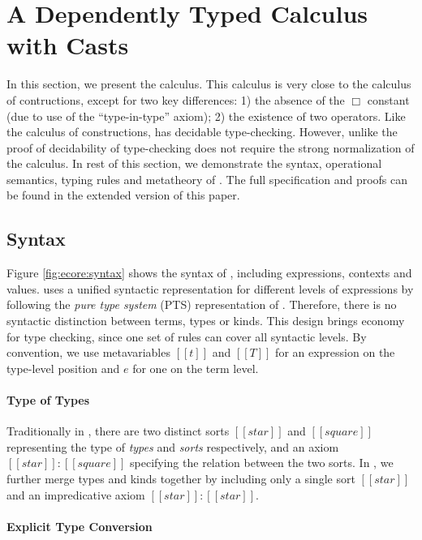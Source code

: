 
\section{A Dependently Typed Calculus with Casts}\label{sec:ecore}

In this section, we present the \ecore calculus. This calculus is very
close to the calculus of contructions, except for two key differences:
1) the absence of the $\Box$ constant (due to use of the
``type-in-type'' axiom); 2) the existence of two \cast operators. Like
the calculus of constructions, \ecore has decidable
type-checking. However, unlike \cc the proof of decidability of
type-checking does not require the strong normalization of the
calculus.  In rest of this section, we demonstrate the syntax,
operational semantics, typing rules and metatheory of \ecore. The
full specification and proofs can be found in the extended version of
this paper.  

\subsection{Syntax}\label{sec:ecore:syn}

Figure \ref{fig:ecore:syntax} shows the syntax of \ecore, including
expressions, contexts and values. \ecore uses a unified syntactic
representation for different levels of expressions by following the
\emph{pure type system} (PTS) representation of \cc. Therefore, there
is no syntactic distinction between terms, types or kinds. This design
brings economy for type checking, since one set of rules can cover
all syntactic levels. By convention, we use metavariables $[[t]]$ and
$[[T]]$ for an expression on the type-level position and $e$ for one
on the term level.

\paragraph{Type of Types}
Traditionally in \cc, there are two distinct sorts $[[star]]$ and
$[[square]]$ representing the type of \emph{types} and \emph{sorts}
respectively, and an axiom $[[star]]:[[square]]$ specifying the
relation between the two sorts. In \ecore, we further merge types and
kinds together by including only a single sort $[[star]]$ and an
impredicative axiom $[[star]]:[[star]]$.

\paragraph{Explicit Type Conversion}

